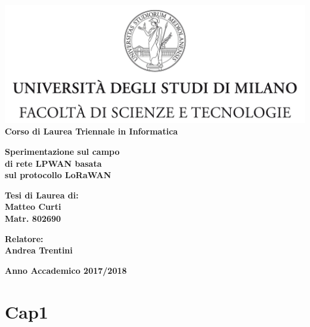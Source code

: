 \documentclass[a4paper]{report} %
\begin{document}
\hypersetup{pageanchor=false}
\begin{titlepage}
\begin{center}
\includegraphics[width=\textwidth]{Logo.jpg}\\
{\large{\bf Corso di Laurea Triennale in Informatica}}
\end{center}
\vspace{12mm}
\begin{center}
{\huge{\bf Sperimentazione sul campo}}\\
\vspace{4mm}
{\huge{\bf di rete LPWAN basata}}\\
\vspace{4mm}
{\huge{\bf sul protocollo LoRaWAN}}\\
\end{center}
\vspace{12mm}
\begin{flushright}
{\large{\bf Tesi di Laurea di:}}\\
{\large{\bf Matteo Curti}}\\
{\large{\bf Matr. 802690}}\\
\end{flushright}
\vspace{4mm}
\begin{flushleft}
{\large{\bf Relatore:}}\\
{\large{\bf Andrea Trentini}}\\
\vspace{4mm}
\end{flushleft}
\vspace{12mm}
\begin{center}
{\large{\bf Anno Accademico 2017/2018}}
\end{center}
\end{titlepage}
\tableofcontents
\chapter{Cap1}
\end{document}
